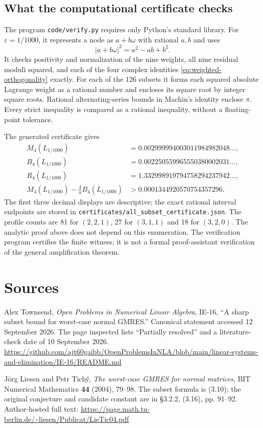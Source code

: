 \documentclass[11pt,a4paper]{article}
\theoremstyle{remark}
\newcommand{\eps}{\varepsilon}
\newcommand{\om}{\omega}
\begin{document}
\subsection{What the computational certificate checks}
The program \texttt{code/verify.py} requires only Python's standard library.
For $\eps=1/1000$, it represents a node as $a+b\om$ with rational $a,b$ and
uses
\[
 |a+b\om|^2=a^2-ab+b^2.
\]
It checks positivity and normalization of the nine weights, all nine residual
moduli squared, and each of the four complex identities
\eqref{eq:weighted-orthogonality} exactly.
For each of the 126 subsets it forms each squared absolute Lagrange weight
as a rational number and encloses its square root by integer square roots.
Rational alternating-series bounds in Machin's identity enclose $\pi$.
Every strict inequality is compared as a rational inequality, without a
floating-point tolerance.

The generated certificate gives
\begin{align*}
 M_4(L_{1/1000})&=0.002999994003011984982048\ldots,\\
 B_4(L_{1/1000})&=0.002250559965550380002031\ldots,\\
 R_4(L_{1/1000})&=1.332998919794758294237942\ldots,\\
 M_4(L_{1/1000})-\frac4\pi B_4(L_{1/1000})
 &>0.0001344920570754357296.
\end{align*}
The first three decimal displays are descriptive; the exact rational interval
endpoints are stored in \texttt{certificates/all\_subset\_certificate.json}.
The profile counts are 81 for $(2,2,1)$, 27 for $(3,1,1)$ and 18 for $(3,2,0)$.
The analytic proof above does not depend on this enumeration. The verification
program certifies the finite witness; it is not a formal proof-assistant
verification of the general amplification theorem.

\section*{Sources}
\begin{enumerate}[label={[\arabic*]},leftmargin=2em]
\item Alex Townsend, \emph{Open Problems in Numerical Linear Algebra},
IE-16, ``A sharp subset bound for worst-case normal GMRES.''
Canonical statement accessed 12 September 2026. The page inspected lists
``Partially resolved'' and a literature-check date of 10 September 2026.
\url{https://github.com/ajt60gaibb/OpenProblemsInNLA/blob/main/linear-systems-and-elimination/IE-16/README.md}
\item J\"org Liesen and Petr Tich\'y, \emph{The worst-case GMRES for normal
matrices}, BIT Numerical Mathematics \textbf{44} (2004), 79--98.
The subset formula is (3.10); the original conjecture and candidate constant
are in \S3.2.2, (3.16), pp. 91--92. Author-hosted full text:
\url{https://page.math.tu-berlin.de/~liesen/Publicat/LieTic04.pdf}
\end{enumerate}
\end{document}
